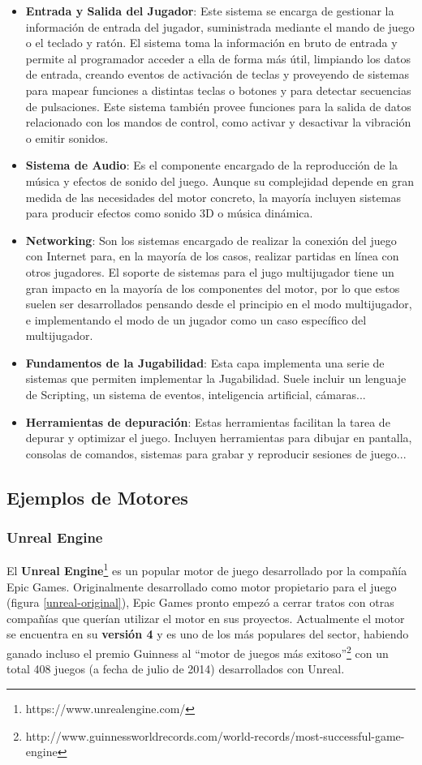 \begin{itemize}
\item\textbf{Entrada y Salida del Jugador}: Este sistema se encarga de gestionar la información de entrada del jugador, suministrada mediante el mando de juego o el teclado y ratón. El sistema toma la información en bruto de entrada y permite al programador acceder a ella de forma más útil, limpiando los datos de entrada, creando eventos de activación de teclas y proveyendo de sistemas para mapear funciones a distintas teclas o botones y para detectar secuencias de pulsaciones. Este sistema también provee funciones para la salida de datos relacionado con los mandos de control, como activar y desactivar la vibración o emitir sonidos.
\item\textbf{Sistema de Audio}: Es el componente encargado de la reproducción de la música y efectos de sonido del juego. Aunque su complejidad depende en gran medida de las necesidades del motor concreto, la mayoría incluyen sistemas para producir efectos como sonido 3D o música dinámica.
\item\textbf{Networking}: Son los sistemas encargado de realizar la conexión del juego con Internet para, en la mayoría de los casos, realizar partidas en línea con otros jugadores. El soporte de sistemas para el jugo multijugador tiene un gran impacto en la mayoría de los componentes del motor, por lo que estos suelen ser desarrollados pensando desde el principio en el modo multijugador, e implementando el modo de un jugador como un caso específico del multijugador.
\item\textbf{Fundamentos de la Jugabilidad}: Esta capa implementa una serie de sistemas que permiten implementar la Jugabilidad. Suele incluir un lenguaje de Scripting, un sistema de eventos, inteligencia artificial, cámaras...
\item\textbf{Herramientas de depuración}: Estas herramientas facilitan la tarea de depurar y optimizar el juego. Incluyen herramientas para dibujar en pantalla, consolas de comandos, sistemas para grabar y reproducir sesiones de juego...
\end{itemize}

\subsection{Ejemplos de Motores}
\subsubsection{Unreal Engine}
El \textbf{Unreal Engine}\footnote{https://www.unrealengine.com/} es un popular motor de juego desarrollado por la compañía Epic Games. Originalmente desarrollado como motor propietario para el juego  (figura \ref{unreal-original}), Epic Games pronto empezó a cerrar tratos con otras compañías que querían utilizar el motor en sus proyectos. Actualmente el motor se encuentra en su \textbf{versión 4} y es uno de los más populares del sector, habiendo ganado incluso el premio Guinness al ``motor de juegos más exitoso''\footnote{http://www.guinnessworldrecords.com/world-records/most-successful-game-engine} con un total 408 juegos (a fecha de julio de 2014) desarrollados con Unreal. 

